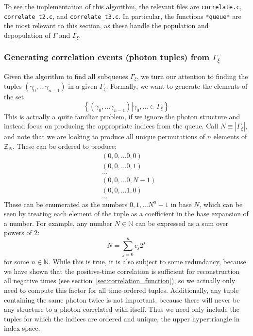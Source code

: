 \documentclass{article}
\newcommand{\braces}[1]{\ensuremath{\left\lbrace #1 \right\rbrace}}
\newcommand{\integers}{\ensuremath{\mathbb{Z}}}
\newcommand{\wholes}{\ensuremath{\mathbb{N}}}
\newcommand{\abs}[1]{\ensuremath{\left|#1\right|}}
\newcommand{\photon}{\ensuremath{\gamma}}
\newcommand{\photons}{\ensuremath{\Gamma}}
\newcommand{\timewindow}{\ensuremath{\xi}}
\begin{document}
To see the implementation of this algorithm, the relevant files are \texttt{correlate.c}, \texttt{correlate\_t2.c}, and \texttt{correlate\_t3.c}. In particular, the functions \texttt{*queue*} are the most relevant to this section, as these handle the population and depopulation of \photons{} and $\photons_{\timewindow}$.

\subsubsection{Generating correlation events (photon tuples) from $\photons_{\timewindow}$}
Given the algorithm to find all subqueues $\photons_{\timewindow}$, we turn our attention to finding the tuples $(\photon_{0},\ldots\photon_{n-1})$ in a given $\photons_{\timewindow}$. Formally, we want to generate the elements of the set
\begin{equation}
\braces{(\photon_{0},\ldots\photon_{n-1})\left|\photon_{0},\ldots\in\photons_{\timewindow}\right.}
\end{equation}
This is actually a quite familiar problem, if we ignore the photon structure and instead focus on producing the appropriate indices from the queue. Call $N\equiv\abs{\photons_{\timewindow}}$, and note that we are looking to produce all unique permutations of $n$ elements of $\integers_{N}$. These can be ordered to produce:
\begin{align*}
&(0, 0,\ldots 0, 0) \\
&(0, 0, \ldots 0, 1) \\
&\ldots \\ 
&(0, 0, \ldots 0, N-1) \\
&(0, 0, \ldots 1, 0) \\
&\ldots 
\end{align*}
These can be enumerated as the numbers $0,1,\ldots N^{n}-1$ in base $N$, which can be seen by treating each element of the tuple as a coefficient in the base expansion of a number. For example, any number $N\in\wholes$ can be expressed as a sum over powers of 2:
\begin{equation}
N = \sum_{j=0}^{n}{c_{j}2^{j}}
\end{equation}
for some $n\in\wholes$. While this is true, it is also subject to some redundancy, because we have shown that the positive-time correlation is sufficient for reconstruction all negative times (see section~\ref{sec:correlation_function}), so we actually only need to compute this factor for all time-ordered tuples. Additionally, any tuple containing the same photon twice is not important, because there will never be any structure to a photon correlated with itself. Thus we need only include the tuples for which the indices are ordered and unique, the upper hypertriangle in index space.
\end{document}
